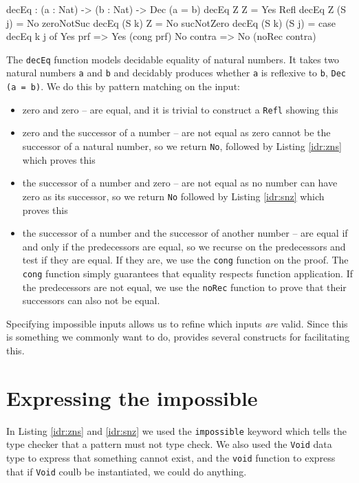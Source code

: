    	\begin{code}[label={des:dec-eq}, caption={Proving equality of natural numbers}]
    decEq : (a : Nat) -> (b : Nat) -> Dec (a = b)
    decEq Z Z = Yes Refl
    decEq Z (S j) = No zeroNotSuc
    decEq (S k) Z = No sucNotZero
    decEq (S k) (S j) = case decEq k j of
                            Yes prf => Yes (cong prf)
                            No contra => No (noRec contra)
   	\end{code}
    The \texttt{decEq} function models decidable equality of natural numbers. It takes two natural numbers \texttt{a} and \texttt{b} and decidably produces whether \texttt{a} is reflexive to \texttt{b}, \texttt{Dec (a = b)}. We do this by pattern matching on the input:
    \begin{itemize}
        \item zero and zero -- are equal, and it is trivial to construct a
              \texttt{Refl} showing this
        \item zero and the successor of a number -- are not equal as zero cannot
              be the successor of a natural number, so we return \texttt{No},
              followed by Listing \ref{idr:zns} which proves this
        \item the successor of a number and zero -- are not equal as no number 
              can have zero as its successor, so we return \texttt{No} followed
              by Listing \ref{idr:snz} which proves this
        \item the successor of a number and the successor of another number --
              are equal if and only if the predecessors are equal, so we recurse
              on the predecessors and test if they are equal. If they are, we
              use the \texttt{cong} function on the proof. The \texttt{cong}
              function simply guarantees that equality respects function
              application. If the predecessors are not equal, we use the
              \texttt{noRec} function to prove that their successors can also
              not be equal.
    \end{itemize}

    Specifying impossible inputs allows us to refine which inputs \textit{are} valid. Since this is something we commonly want to do, \Idris provides several constructs for facilitating this.


\section{Expressing the impossible}
    In Listing \ref{idr:zns} and \ref{idr:snz} we used the \texttt{impossible} keyword which tells the type checker that a pattern must not type check. We also used the \texttt{Void} data type to express that something cannot exist, and the \texttt{void} function to express that if \texttt{Void} coulb be instantiated, we could do anything.
    
